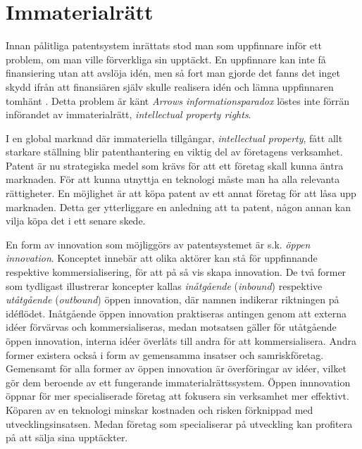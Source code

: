 \section{Immaterialrätt}

Innan pålitliga patentsystem inrättats stod man som uppfinnare inför ett problem, om man ville förverkliga sin upptäckt.
En uppfinnare kan inte få finansiering utan att avslöja idén, men så fort man gjorde det fanns det inget skydd ifrån att finansiären själv skulle realisera idén och lämna uppfinnaren tomhänt \cite{nard}.
Detta problem är känt \emph{Arrows informationsparadox} löstes inte förrän införandet av immaterialrätt, \emph{intellectual property rights}.

I en global marknad där immateriella tillgångar, \emph{intellectual property}, fått allt starkare ställning blir patenthantering en viktig del av företagens verksamhet.
Patent är nu strategiska medel som krävs för att ett företag skall kunna äntra marknaden.
För att kunna utnyttja en teknologi måste man ha alla relevanta rättigheter.
En möjlighet är att köpa patent av ett annat företag för att låsa upp marknaden.
Detta ger ytterliggare en anledning att ta patent, någon annan kan vilja köpa det i ett senare skede.

En form av innovation som möjliggörs av patentsystemet är s.k. \emph{öppen innovation}.
Konceptet innebär att olika aktörer kan stå för uppfinnande respektive kommersialisering, för att på så vis skapa innovation.
De två former som tydligast illustrerar koncepter kallas \emph{inåtgående} (\emph{inbound}) respektive \emph{utåtgående} (\emph{outbound}) öppen innovation, där namnen indikerar riktningen på idéflödet.
Inåtgående öppen innovation praktiseras antingen genom att externa idéer förvärvas och kommersialiseras, medan motsatsen gäller för utåtgående öppen innovation, interna idéer överlåts till andra för att kommersialisera.
Andra former existera också i form av gemensamma insatser och samriskföretag.
Gemensamt för alla former av öppen innovation är överföringar av idéer, vilket gör dem beroende av ett fungerande immaterialrättssystem.
Öppen innnovation öppnar för mer specialiserade företag att fokusera sin verksamhet mer effektivt.
Köparen av en teknologi minskar kostnaden och risken förknippad med utvecklingsinsatsen. 
Medan företag som specialiserar på utveckling kan profitera på att sälja sina upptäckter.
